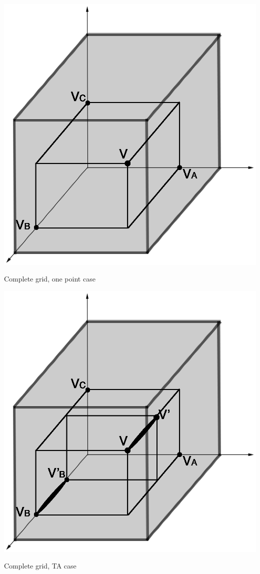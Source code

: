 \begin{multicols}{2}{
\begin{figurehere}
\begin{center}
\includegraphics[scale=0.40]{Interpolation-GRID-INS.eps}
\caption{Complete grid, one point case}
\label{figNCRGRIDINS}
\end{center}
\end{figurehere}

\begin{figurehere}
\begin{center}
\includegraphics[scale=0.40]{Interpolation-GRID-TA.eps}
\caption{Complete grid, TA case}
\label{figNCRGRIDTA}
\end{center}
\end{figurehere}

}
\end{multicols}
